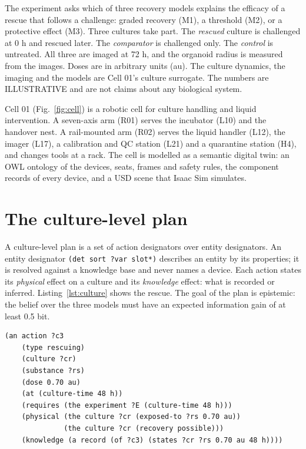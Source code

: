 \documentclass[10pt,a4paper]{article}
\begin{document}
The experiment asks which of three recovery models explains the efficacy of a rescue that follows a challenge: graded recovery (M1), a threshold (M2), or a protective effect (M3). Three cultures take part. The \emph{rescued} culture is challenged at 0 h and rescued later. The \emph{comparator} is challenged only. The \emph{control} is untreated. All three are imaged at 72 h, and the organoid radius is measured from the images. Doses are in arbitrary units (au). The culture dynamics, the imaging and the models are Cell 01's culture surrogate. The numbers are ILLUSTRATIVE and are not claims about any biological system.

Cell 01 (Fig.~\ref{fig:cell}) is a robotic cell for culture handling and liquid intervention. A seven-axis arm (R01) serves the incubator (L10) and the handover nest. A rail-mounted arm (R02) serves the liquid handler (L12), the imager (L17), a calibration and QC station (L21) and a quarantine station (H4), and changes tools at a rack. The cell is modelled as a semantic digital twin: an OWL ontology of the devices, seats, frames and safety rules, the component records of every device, and a USD scene that Isaac Sim simulates.

\section{The culture-level plan}\label{sec:culture}

A culture-level plan is a set of action designators over entity designators. An entity designator \texttt{(det sort ?var slot*)} describes an entity by its properties; it is resolved against a knowledge base and never names a device. Each action states its \emph{physical} effect on a culture and its \emph{knowledge} effect: what is recorded or inferred. Listing~\ref{lst:culture} shows the rescue. The goal of the plan is epistemic: the belief over the three models must have an expected information gain of at least 0.5 bit.

\begin{listing}[tbp]
\begin{Verbatim}[fontsize=\footnotesize,breaklines,frame=lines,framesep=2mm]
(an action ?c3
    (type rescuing)
    (culture ?cr)
    (substance ?rs)
    (dose 0.70 au)
    (at (culture-time 48 h))
    (requires (the experiment ?E (culture-time 48 h)))
    (physical (the culture ?cr (exposed-to ?rs 0.70 au))
              (the culture ?cr (recovery possible)))
    (knowledge (a record (of ?c3) (states ?cr ?rs 0.70 au 48 h))))
\end{Verbatim}
\caption{The rescue action of the culture plan (LDL). Times are culture times; the dose is ILLUSTRATIVE.}\label{lst:culture}
\end{listing}
\end{document}
